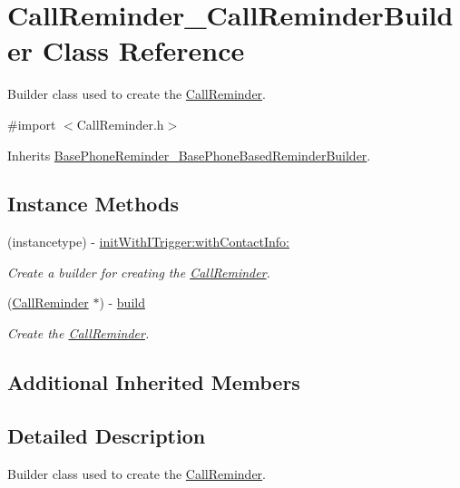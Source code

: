 \hypertarget{interface_call_reminder___call_reminder_builder}{}\section{Call\+Reminder\+\_\+\+Call\+Reminder\+Builder Class Reference}
\label{interface_call_reminder___call_reminder_builder}


Builder class used to create the \hyperlink{interface_call_reminder}{Call\+Reminder}.  




{\ttfamily \#import $<$Call\+Reminder.\+h$>$}



Inherits \hyperlink{interface_base_phone_reminder___base_phone_based_reminder_builder}{Base\+Phone\+Reminder\+\_\+\+Base\+Phone\+Based\+Reminder\+Builder}.

\subsection*{Instance Methods}
\begin{DoxyCompactItemize}
\item 
(instancetype) -\/ \hyperlink{interface_call_reminder___call_reminder_builder_a4221fc3846f07f46cd8fdabef0aeb4df}{init\+With\+I\+Trigger\+:with\+Contact\+Info\+:}
\begin{DoxyCompactList}\small\item\em Create a builder for creating the \hyperlink{interface_call_reminder}{Call\+Reminder}. \end{DoxyCompactList}\item 
(\hyperlink{interface_call_reminder}{Call\+Reminder} $\ast$) -\/ \hyperlink{interface_call_reminder___call_reminder_builder_ad2167565916b7f445bbc882b6f06bff7}{build}
\begin{DoxyCompactList}\small\item\em Create the \hyperlink{interface_call_reminder}{Call\+Reminder}. \end{DoxyCompactList}\end{DoxyCompactItemize}
\subsection*{Additional Inherited Members}


\subsection{Detailed Description}
Builder class used to create the \hyperlink{interface_call_reminder}{Call\+Reminder}. 

